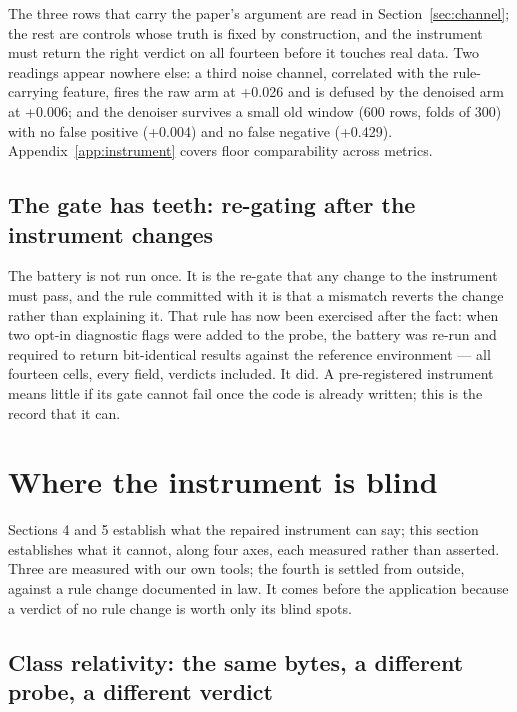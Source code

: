 \documentclass[10pt]{article} %
\begin{document}
The three rows that carry the paper's argument are read in Section~\ref{sec:channel}; the rest are
controls whose truth is fixed by construction, and the instrument must return the right verdict on
all fourteen before it touches real data. Two readings appear nowhere else: a third noise channel,
correlated with the rule-carrying feature, fires the raw arm at +0.026 and is defused by the
denoised arm at +0.006; and the denoiser survives a small old window (600 rows, folds of 300) with
no false positive (+0.004) and no false negative (+0.429). Appendix~\ref{app:instrument} covers floor
comparability across metrics.

\subsection{The gate has teeth: re-gating after the instrument changes}\label{sec:regate}

The battery is not run once. It is the re-gate that any change to the instrument must pass, and the
rule committed with it is that a mismatch reverts the change rather than explaining it. That rule
has now been exercised after the fact: when two opt-in diagnostic flags were added to the probe, the
battery was re-run and required to return bit-identical results against the reference
environment --- all fourteen cells, every field, verdicts included. It did. A pre-registered
instrument means little if its gate cannot fail once the code is already written; this is the record
that it can.

\section{Where the instrument is blind}\label{sec:blind}

Sections 4 and 5 establish what the repaired instrument can say; this section establishes what it
cannot, along four axes, each measured rather than asserted. Three are measured with our own
tools; the fourth is settled from outside, against a rule change documented in law. It comes
before the application because a verdict of no rule change is worth only its blind spots.

\subsection{Class relativity: the same bytes, a different probe, a different verdict}\label{sec:classrel}
\end{document}
